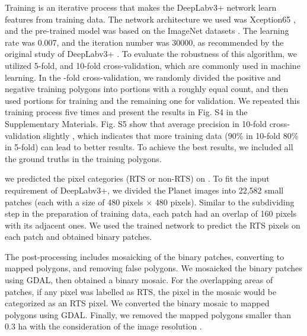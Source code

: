 \documentclass[authoryear,preprint,review,12pt]{elsarticle}
\begin{document}
Training is an iterative process that makes the DeepLabv3+ network learn features from training data. The network architecture we used was Xception65 \citep{chollet2017xception}, and the pre-trained model was based on the ImageNet datasets \citep{russakovsky2015imagenet}. The learning rate was 0.007, and the iteration number was 30000, as recommended by the original study of DeepLabv3+ \citep{chen_encoder-decoder_2018}.  To evaluate the robustness of this algorithm, we utilized 5-fold, and 10-fold cross-validation, which are commonly used in machine learning. In the -fold cross-validation, we randomly divided the positive and negative training polygons into  portions with a roughly equal count, and then used  portions for training and the remaining one for validation. We repeated this training process five times and present the results in Fig. S4 in the Supplementary Materials. Fig. S5  show that average precision in  10-fold cross-validation  slightly , which indicates that more training data (90\% in 10-fold 80\% in 5-fold) can lead to better results. To achieve the best results, we included all the ground truths in the training polygons. 

 we  predicted the pixel categories (RTS or non-RTS) on . To fit the input requirement of DeepLabv3+, we divided the Planet images into 22,582 small patches (each with a size of 480 pixels $\times$ 480 pixels). Similar to the subdividing step in the preparation of training data, each patch had an overlap of 160 pixels with its adjacent ones. We used the trained network to predict the RTS pixels on each patch and obtained binary patches. 

The post-processing includes mosaicking of the binary patches, converting to mapped polygons, and removing false polygons. We mosaicked the binary patches using GDAL, then obtained a binary mosaic. For the overlapping areas of patches, if any pixel was labelled as RTS, the pixel in the mosaic would be categorized as an RTS pixel. We converted the binary mosaic to mapped polygons using GDAL. Finally, we removed the mapped polygons  smaller than 0.3 ha with the consideration of the image resolution .  
\end{document}
